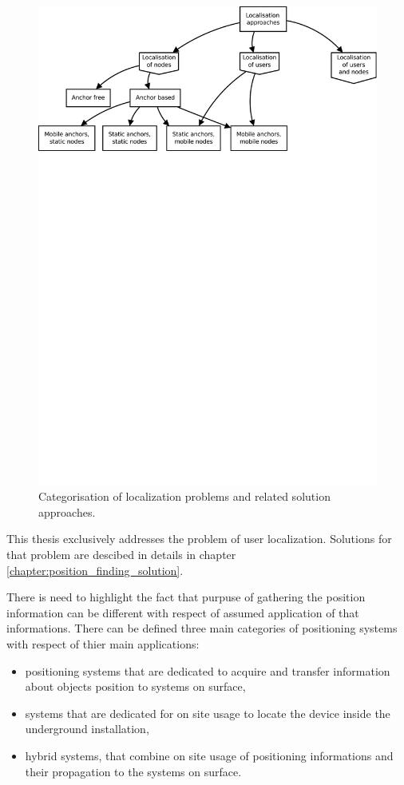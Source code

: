 \documentclass[../main.tex]{subfiles}
\begin{document}
\begin{figure}[ht]
\includegraphics[width=\textwidth, trim={0 20cm 0 0},clip]{pictures/localisation_approaches.pdf}
\centering
\caption{Categorisation of localization problems and related solution approaches\cite{discover_beacons_and_position}.}
\label{fig:localisation_approaches}
\end{figure}

This thesis exclusively addresses the problem of user localization. Solutions for that problem are descibed in details in chapter \ref{chapter:position_finding_solution}.


There is need to highlight the fact that purpuse of gathering the position information can be different with respect of assumed application of that informations. There can be defined three main categories of positioning systems with respect of thier main applications:
\begin{itemize}
	\item positioning systems that are dedicated to acquire and transfer information about objects position to systems on surface,
	\item systems that are dedicated for on site usage to locate the device inside the underground installation,
	\item hybrid systems, that combine on site usage of positioning informations and their propagation to the systems on surface.
\end{itemize}
\end{document}
